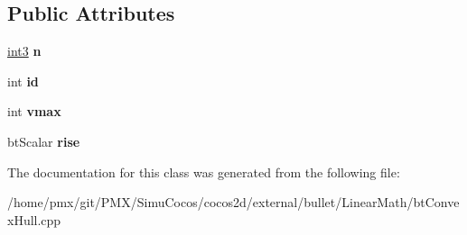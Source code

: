 \subsection*{Public Attributes}
\begin{DoxyCompactItemize}
\item 
\mbox{\label{classbtHullTriangle_a7b331b1599802661ec0136c158ceef8e}} 
\hyperlink{structint3}{int3} {\bfseries n}
\item 
\mbox{\label{classbtHullTriangle_a131cd475bc98a0d8fa4173f0b32f5a52}} 
int {\bfseries id}
\item 
\mbox{\label{classbtHullTriangle_a03dbc3a52bbc6bc45cc13b46458560b7}} 
int {\bfseries vmax}
\item 
\mbox{\label{classbtHullTriangle_a4c20aac7e01e6b137db387c7059160e6}} 
bt\+Scalar {\bfseries rise}
\end{DoxyCompactItemize}


The documentation for this class was generated from the following file\+:\begin{DoxyCompactItemize}
\item 
/home/pmx/git/\+P\+M\+X/\+Simu\+Cocos/cocos2d/external/bullet/\+Linear\+Math/bt\+Convex\+Hull.\+cpp\end{DoxyCompactItemize}
